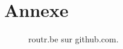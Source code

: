 \documentclass[a4paper,11pt]{article}
\begin{document}
\pagebreak

\section{Annexe}

\begin{figure}[!ht]
\centering
{}
\caption{routr.be sur github.com.}
\label{github}
\end{figure}
\end{document}
